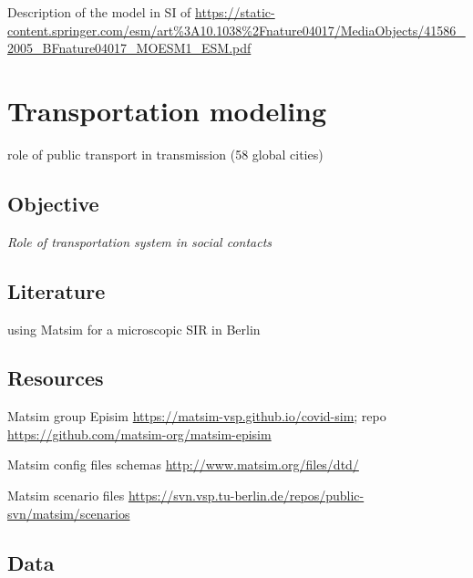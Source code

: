 \documentclass[10pt]{article}
\begin{document}
Description of the model in SI of \cite{ferguson2005strategies}
\url{https://static-content.springer.com/esm/art\%3A10.1038\%2Fnature04017/MediaObjects/41586_2005_BFnature04017_MOESM1_ESM.pdf}


\cite{adam2020simulating}




\section{Transportation modeling}


\cite{zhu2021effects} role of public transport in transmission (58 global cities)

\cite{leung2021real}

\subsection{Objective}

\textit{Role of transportation system in social contacts}

\subsection{Literature}

\cite{11303_10945} using Matsim for a microscopic SIR in Berlin

\cite{ku2021safe}

\subsection{Resources}

Matsim group Episim \url{https://matsim-vsp.github.io/covid-sim}; repo \url{https://github.com/matsim-org/matsim-episim}

Matsim config files schemas \url{http://www.matsim.org/files/dtd/}

Matsim scenario files \url{https://svn.vsp.tu-berlin.de/repos/public-svn/matsim/scenarios}
	
\subsection{Data}
\end{document}
